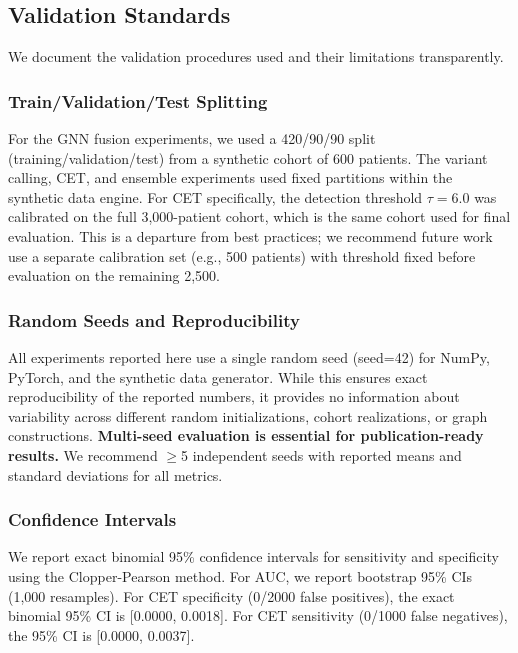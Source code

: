 \documentclass[10pt,a4paper]{article}
\begin{document}
\subsection{Validation Standards}
\label{sec:validation}

We document the validation procedures used and their limitations transparently.

\subsubsection{Train/Validation/Test Splitting}

For the GNN fusion experiments, we used a 420/90/90 split (training/validation/test) from a synthetic cohort of 600 patients. The variant calling, CET, and ensemble experiments used fixed partitions within the synthetic data engine. For CET specifically, the detection threshold $\tau = 6.0$ was calibrated on the full 3,000-patient cohort, which is the same cohort used for final evaluation. This is a departure from best practices; we recommend future work use a separate calibration set (e.g., 500 patients) with threshold fixed before evaluation on the remaining 2,500.

\subsubsection{Random Seeds and Reproducibility}

All experiments reported here use a single random seed (seed=42) for NumPy, PyTorch, and the synthetic data generator. While this ensures exact reproducibility of the reported numbers, it provides no information about variability across different random initializations, cohort realizations, or graph constructions. \textbf{Multi-seed evaluation is essential for publication-ready results.} We recommend $\geq$5 independent seeds with reported means and standard deviations for all metrics.

\subsubsection{Confidence Intervals}

We report exact binomial 95\% confidence intervals for sensitivity and specificity using the Clopper-Pearson method. For AUC, we report bootstrap 95\% CIs (1,000 resamples). For CET specificity (0/2000 false positives), the exact binomial 95\% CI is [0.0000, 0.0018]. For CET sensitivity (0/1000 false negatives), the 95\% CI is [0.0000, 0.0037].
\end{document}
